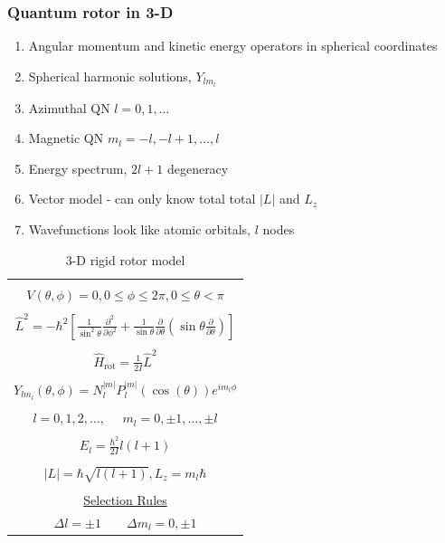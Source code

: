 \documentclass[11pt]{article}
\begin{document}
\subsubsection{Quantum rotor in 3-D}
\label{sec:org108bce4}
\begin{enumerate}
\item Angular momentum and kinetic energy operators in spherical coordinates
\item Spherical harmonic solutions, \(Y_{lm_l}\)
\item Azimuthal QN \(l=0, 1, \ldots\)
\item Magnetic QN \(m_l = -l, -l+1, ..., l\)
\item Energy spectrum, \(2 l + 1\) degeneracy
\item Vector model - can only know total total \(|L|\) and \(L_z\)
\item Wavefunctions look like atomic orbitals, \(l\) nodes
\end{enumerate}

\begin{table}
   \begin{center}
   \caption{3-D rigid rotor model}
    \label{3-D Rigid rotor}
\begin{tabular}[h]{|c|}
\hline
 \\
$\displaystyle       V(\theta,\phi) = 0, 0 \leq \phi \leq 2\pi, 0 \leq \theta <
\pi$ \\
 \\
$\displaystyle     \hat L^2 = -\hbar^2 \left [
  \frac{1}{\sin^2\theta}\frac{\partial^2}{\partial \phi^2}+\frac{1}{\sin
    \theta}\frac{\partial}{\partial \theta}\left ( \sin \theta
    \frac{\partial}{\partial \theta}\right ) \right ] $ \\
\\
$\displaystyle \hat H_\text{rot} = \frac{1}{2 I} \hat L^2$ \\
\\
$\displaystyle     Y_{lm_l}(\theta,\phi)=N_l^{|m|}P_l^{|m|}(\cos(\theta))e^{im_l\phi}$ \\
\\
$\displaystyle l = 0, 1, 2, \ldots, \ \ \ \ \ \ m_l = 0,\pm 1, \ldots, \pm l$
\\
\\
$\displaystyle     E_{l}=\frac{\hbar^2}{2 I}l(l+1)$ \\
 \\
$\displaystyle |L| = \hbar \sqrt{l(l+1)}, L_z = m_l \hbar $ \\
\\ \underline{Selection Rules} \\
$\displaystyle \Delta l = \pm 1\qquad \Delta m_l = 0, \pm 1 $
\\
\hline
\end{tabular}
 \end{center}
\end{table}
\end{document}
